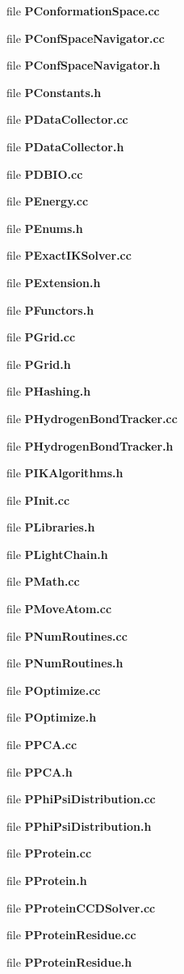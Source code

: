 \begin{CompactItemize}
file {\bf PConformation\-Space.cc}
\item 
file {\bf PConf\-Space\-Navigator.cc}
\item 
file {\bf PConf\-Space\-Navigator.h}
\item 
file {\bf PConstants.h}
\item 
file {\bf PData\-Collector.cc}
\item 
file {\bf PData\-Collector.h}
\item 
file {\bf PDBIO.cc}
\item 
file {\bf PEnergy.cc}
\item 
file {\bf PEnums.h}
\item 
file {\bf PExact\-IKSolver.cc}
\item 
file {\bf PExtension.h}
\item 
file {\bf PFunctors.h}
\item 
file {\bf PGrid.cc}
\item 
file {\bf PGrid.h}
\item 
file {\bf PHashing.h}
\item 
file {\bf PHydrogen\-Bond\-Tracker.cc}
\item 
file {\bf PHydrogen\-Bond\-Tracker.h}
\item 
file {\bf PIKAlgorithms.h}
\item 
file {\bf PInit.cc}
\item 
file {\bf PLibraries.h}
\item 
file {\bf PLight\-Chain.h}
\item 
file {\bf PMath.cc}
\item 
file {\bf PMove\-Atom.cc}
\item 
file {\bf PNum\-Routines.cc}
\item 
file {\bf PNum\-Routines.h}
\item 
file {\bf POptimize.cc}
\item 
file {\bf POptimize.h}
\item 
file {\bf PPCA.cc}
\item 
file {\bf PPCA.h}
\item 
file {\bf PPhi\-Psi\-Distribution.cc}
\item 
file {\bf PPhi\-Psi\-Distribution.h}
\item 
file {\bf PProtein.cc}
\item 
file {\bf PProtein.h}
\item 
file {\bf PProtein\-CCDSolver.cc}
\item 
file {\bf PProtein\-Residue.cc}
\item 
file {\bf PProtein\-Residue.h}

\end{CompactItemize}
